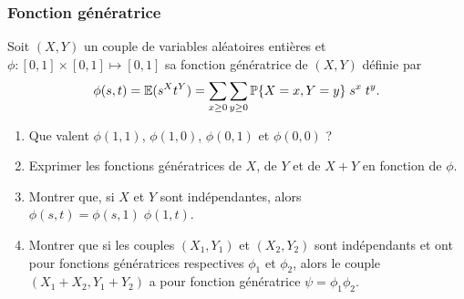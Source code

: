 \subsubsection{Fonction génératrice \todo{}}

Soit $(X, Y)$ un couple de variables aléatoires entières et $\phi: [0, 1] \times [0, 1] \mapsto [0, 1]$ sa fonction génératrice de $(X, Y)$ définie par 
$$
\phi(s, t) = \operatorname{\mathbb{E}}(s^X t^Y) = \sum_{x \geq 0} \sum_{y \geq 0} \operatorname{\mathbb{P}}\{X=x, Y=y\} \; s^x \; t^y.
$$
\begin{enumerate}
  \item Que valent $\phi(1, 1)$, $\phi(1, 0)$, $\phi(0, 1)$ et $\phi(0, 0)$ ?
  \item Exprimer les fonctions génératrices de $X$, de $Y$ et de $X+Y$ en fonction de $\phi$.
  \item Montrer que, si $X$ et $Y$ sont indépendantes, alors $\phi(s, t) = \phi(s, 1) \; \phi(1, t)$.
  \item Montrer que si les couples $(X_1, Y_1)$ et $(X_2, Y_2)$ sont indépendants et ont pour fonctions génératrices respectives $\phi_1$ et $\phi_2$, alors le couple $(X_1+X_2, Y_1+Y_2)$ a pour fonction génératrice $\psi = \phi_1 \phi_2$. 
\end{enumerate}
